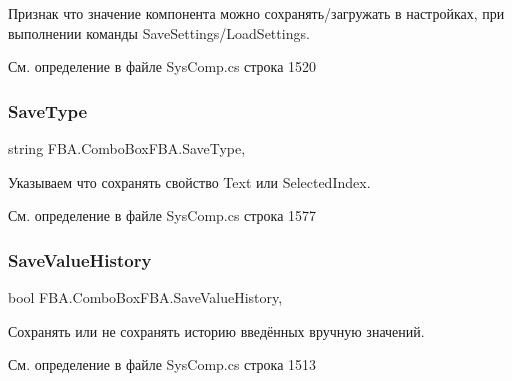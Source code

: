 Признак что значение компонента можно сохранять/загружать в настройках, при выполнении команды Save\+Settings/\+Load\+Settings. 



См. определение в файле Sys\+Comp.\+cs строка 1520

\mbox{\label{class_f_b_a_1_1_combo_box_f_b_a_a21f4edb61f850586f228b7b91cdb3147}} 
\subsubsection{\texorpdfstring{Save\+Type}{SaveType}}
{\footnotesize\ttfamily string F\+B\+A.\+Combo\+Box\+F\+B\+A.\+Save\+Type\hspace{0.3cm}{\ttfamily [get]}, {\ttfamily [set]}}



Указываем что сохранять свойство Text или Selected\+Index. ~\newline




См. определение в файле Sys\+Comp.\+cs строка 1577

\mbox{\label{class_f_b_a_1_1_combo_box_f_b_a_a23279a6ee843d71d495dbe733b2cc34f}} 
\subsubsection{\texorpdfstring{Save\+Value\+History}{SaveValueHistory}}
{\footnotesize\ttfamily bool F\+B\+A.\+Combo\+Box\+F\+B\+A.\+Save\+Value\+History\hspace{0.3cm}{\ttfamily [get]}, {\ttfamily [set]}}



Сохранять или не сохранять историю введённых вручную значений. 



См. определение в файле Sys\+Comp.\+cs строка 1513

\mbox{\label{class_f_b_a_1_1_combo_box_f_b_a_a43be64d3254b5fa46243e1e4849c2f50}} 

